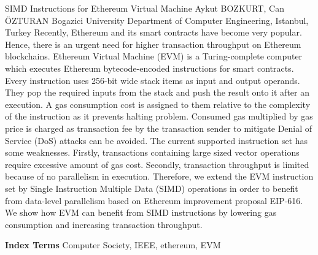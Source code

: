 
    \begin{abstract_online}{SIMD Instructions for Ethereum Virtual Machine}{%
        Aykut BOZKURT, Can ÖZTURAN}{%
        }{%
        Bogazici University Department of Computer Engineering, Istanbul, Turkey}
    Recently, Ethereum and its smart contracts have become very popular. Hence, there is an urgent need for higher transaction throughput on Ethereum blockchains. Ethereum Virtual Machine (EVM) is a Turing-complete computer which executes Ethereum bytecode-encoded instructions for smart contracts. Every instruction uses 256-bit wide stack items as input and output operands. They pop the required inputs from the stack and push the result onto it after an execution. A gas consumption cost is assigned to them relative to the complexity of the instruction as it prevents halting problem. Consumed gas multiplied by gas price is charged as transaction fee by the transaction sender to mitigate Denial of Service (DoS) attacks can be avoided. The current supported instruction set has some weaknesses. Firstly, transactions containing large sized vector operations require excessive amount of gas cost. Secondly, transaction throughput is limited because of no parallelism in execution. Therefore, we extend the EVM instruction set by Single Instruction Multiple Data (SIMD) operations in order to benefit from data-level parallelism based on Ethereum improvement proposal EIP-616. We show how EVM can benefit from SIMD instructions by lowering gas consumption and increasing transaction throughput. 
    
            \textbf{Index Terms} \newline{}Computer Society, IEEE, ethereum, EVM
    \end{abstract_online}
    